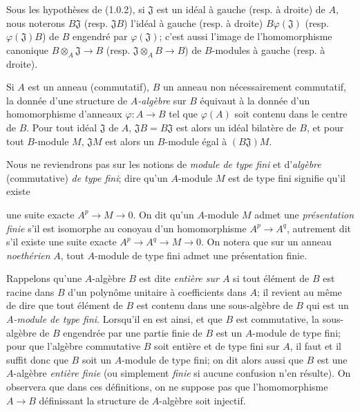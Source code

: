 \begin{env}[1.0.3]
\label{0.1.0.3-fr}
Sous les hypothèses de (1.0.2), si $\mathfrak{J}$ est un idéal à gauche (resp. à droite) de $A$, nous noterons $B\mathfrak{J}$ (resp. $\mathfrak{J}B$) l'idéal à gauche (resp. à droite) $B\varphi(\mathfrak{J})$ (resp. $\varphi(\mathfrak{J})B$) de $B$ engendré par $\varphi(\mathfrak{J})$; c'est aussi l'image de l'homomorphisme canonique $B\otimes_A\mathfrak{J}\to B$ (resp. $\mathfrak{J}\otimes_A B\to B$) de $B$-modules à gauche (resp. à droite).
\end{env}

\begin{env}[1.0.4]
\label{0.1.0.4-fr}
Si $A$ est un anneau (commutatif), $B$ un anneau non nécessairement commutatif, la donnée d'une structure de \emph{$A$-algèbre} sur $B$ équivaut à la donnée d'un homomorphisme d'anneaux $\varphi:A\to B$ tel que $\varphi(A)$ soit contenu dans le centre de $B$.
Pour tout idéal $\mathfrak{J}$ de $A$, $\mathfrak{J}B=B\mathfrak{J}$ est alors un idéal bilatère de $B$, et pour tout $B$-module $M$, $\mathfrak{J}M$ est alors un $B$-module égal à $(B\mathfrak{J})M$.
\end{env}

\begin{env}[1.0.5]
\label{0.1.0.5-fr}
Nous ne reviendrons pas sur les notions de \emph{module de type fini} et d'\emph{algèbre} (commutative) \emph{de type fini}; dire qu'un $A$-module $M$ est de type fini signifie qu'il existe

une suite exacte $A^p\to M\to 0$.
On dit qu'un $A$-module $M$ admet une \emph{présentation finie} s'il est isomorphe au conoyau d'un homomorphisme $A^p\to A^q$, autrement dit s'il existe une suite exacte $A^p\to A^q\to M\to 0$.
On notera que sur un anneau \emph{noethérien} $A$, tout $A$-module de type fini admet une présentation finie.

Rappelons qu'une $A$-algèbre $B$ est dite \emph{entière sur $A$} si tout élément de $B$ est racine dans $B$ d'un polynôme unitaire à coefficients dans $A$; il revient au même de dire que tout élément de $B$ est contenu dans une sous-algèbre de $B$ qui est un \emph{$A$-module de type fini}.
Lorsqu'il en est ainsi, et que $B$ est commutative, la sous-algèbre de $B$ engendrée par une partie finie de $B$ est un $A$-module de type fini; pour que l'algèbre commutative $B$ soit entière et de type fini sur $A$, il faut et il suffit donc que $B$ soit un $A$-module de type fini; on dit alors aussi que $B$ est une $A$-algèbre \emph{entière finie} (ou simplement \emph{finie} si aucune confusion n'en résulte).
On observera que dans ces définitions, on ne suppose pas que l'homomorphisme $A\to B$ définissant la structure de $A$-algèbre soit injectif.
\end{env}

